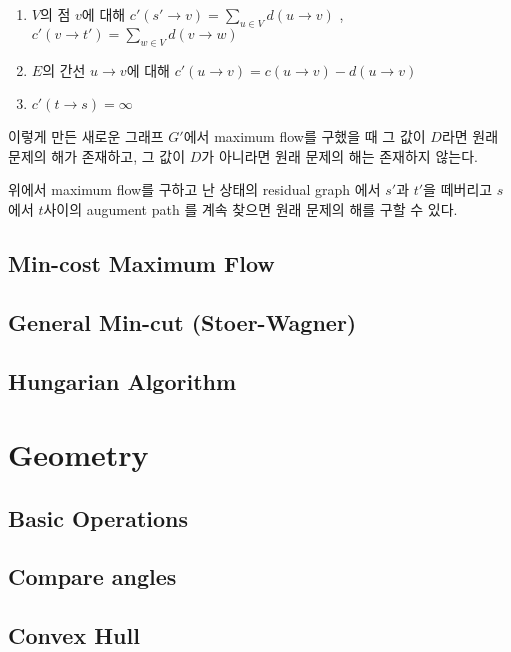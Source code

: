\documentclass[10pt,landscape,a4paper,twocolumn]{article}
\begin{document}
\begin{enumerate}
\item $V$의 점 $v$에 대해 $c'(s' \to v) = \sum_{u \in V} d(u \to v)$ , $c'(v \to t') = \sum_{w \in V} d(v \to w)$
\item $E$의 간선 $u \to v$에 대해 $c'(u \to v) = c(u \to v) - d(u \to v)$
\item $c'(t \to s) = \infty$
\end{enumerate}

이렇게 만든 새로운 그래프 $G'$에서 maximum flow를 구했을 때 그 값이 $D$라면 원래 문제의 해가 존재하고, 그 값이 $D$가 아니라면 원래 문제의 해는 존재하지 않는다.

위에서 maximum flow를 구하고 난 상태의 residual graph 에서 $s'$과 $t'$을 떼버리고 $s$에서 $t$사이의 augument path 를 계속 찾으면 원래 문제의 해를 구할 수 있다. 


\subsection{Min-cost Maximum Flow}


\subsection{General Min-cut (Stoer-Wagner)}


\subsection{Hungarian Algorithm}


\section{Geometry}

\subsection{Basic Operations}


\subsection{Compare angles}

\subsection{Convex Hull}

\end{document}

